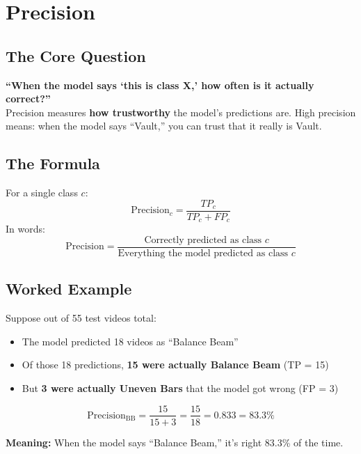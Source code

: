 \documentclass[12pt, a4paper]{article}
\begin{document}
\newpage
\section{Precision}

\subsection{The Core Question}

\begin{keyidea}
\textbf{``When the model says `this is class X,' how often is it actually correct?''}\\[0.3cm]
Precision measures \textbf{how trustworthy} the model's predictions are. High precision means: when the model says ``Vault,'' you can trust that it really is Vault.
\end{keyidea}

\subsection{The Formula}

\begin{formulabox}
For a single class $c$:
\[
\boxed{\text{Precision}_c = \frac{TP_c}{TP_c + FP_c}}
\]
In words:
\[
\text{Precision} = \frac{\text{Correctly predicted as class } c}{\text{Everything the model predicted as class } c}
\]
\end{formulabox}

\subsection{Worked Example}

\begin{examplebox}
Suppose out of 55 test videos total:
\begin{itemize}
    \item The model predicted 18 videos as ``Balance Beam''
    \item Of those 18 predictions, \textbf{15 were actually Balance Beam} (TP = 15)
    \item But \textbf{3 were actually Uneven Bars} that the model got wrong (FP = 3)
\end{itemize}

\[
\text{Precision}_{\text{BB}} = \frac{15}{15 + 3} = \frac{15}{18} = 0.833 = 83.3\%
\]

\textbf{Meaning:} When the model says ``Balance Beam,'' it's right 83.3\% of the time.
\end{examplebox}
\end{document}
